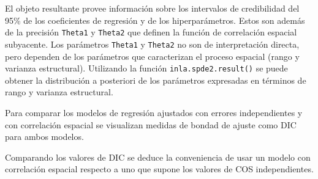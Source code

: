\documentclass[11pt,b5paper,]{krantz}
\newenvironment{Shaded}{}{}
\newcommand{\CommentTok}[1]{\textcolor[rgb]{0.38,0.63,0.69}{\textit{#1}}}
\newcommand{\ControlFlowTok}[1]{\textcolor[rgb]{0.00,0.44,0.13}{\textbf{#1}}}
\newcommand{\DataTypeTok}[1]{\textcolor[rgb]{0.56,0.13,0.00}{#1}}
\newcommand{\DecValTok}[1]{\textcolor[rgb]{0.25,0.63,0.44}{#1}}
\newcommand{\KeywordTok}[1]{\textcolor[rgb]{0.00,0.44,0.13}{\textbf{#1}}}
\newcommand{\NormalTok}[1]{#1}
\newcommand{\OperatorTok}[1]{\textcolor[rgb]{0.40,0.40,0.40}{#1}}
\newcommand{\StringTok}[1]{\textcolor[rgb]{0.25,0.44,0.63}{#1}}
\begin{document}
El objeto resultante provee información sobre los intervalos de credibilidad del 95\% de los coeficientes de regresión y de los hiperparámetros. Estos son además de la precisión \texttt{Theta1} y \texttt{Theta2} que definen la función de correlación espacial subyacente. Los parámetros \texttt{Theta1} y \texttt{Theta2} no son de interpretación directa, pero dependen de los parámetros que caracterizan el proceso espacial (rango y varianza estructural). Utilizando la función \texttt{inla.spde2.result()} se puede obtener la distribución a posteriori de los parámetros expresadas en términos de rango y varianza estructural.

\begin{Shaded}
\end{Shaded}

Para comparar los modelos de regresión ajustados con errores independientes y con correlación espacial se visualizan medidas de bondad de ajuste como DIC para ambos modelos.

\begin{Shaded}
\end{Shaded}

Comparando los valores de DIC se deduce la conveniencia de usar un modelo con correlación espacial respecto a uno que supone los valores de COS independientes.
\end{document}
